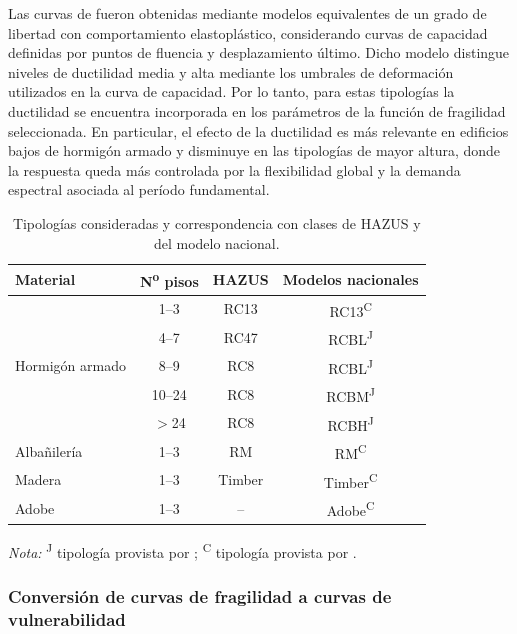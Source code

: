 Las curvas de  fueron obtenidas mediante modelos equivalentes de un grado de libertad con comportamiento elastoplástico, considerando curvas de capacidad definidas por puntos de fluencia y desplazamiento último. Dicho modelo distingue niveles de ductilidad media y alta mediante los umbrales de deformación utilizados en la curva de capacidad. Por lo tanto, para estas tipologías la ductilidad se encuentra incorporada en los parámetros de la función de fragilidad seleccionada. En particular, el efecto de la ductilidad es más relevante en edificios bajos de hormigón armado y disminuye en las tipologías de mayor altura, donde la respuesta queda más controlada por la flexibilidad global y la demanda espectral asociada al período fundamental.

\begin{table}[H]
\centering
\caption{Tipologías consideradas y correspondencia con clases de HAZUS y del modelo nacional.}
\label{tab:meto_tipologias_modelos}
\small
\setlength{\tabcolsep}{5pt}
\renewcommand{\arraystretch}{1.10}
\begin{tabular}{@{} l c c c @{}}
\toprule
\textbf{Material} & \textbf{N\textsuperscript{o} pisos} & \textbf{HAZUS} & \textbf{Modelos nacionales} \\
\midrule
\multirow{5}{*}{Hormigón armado}
 & 1--3   & RC13 & RC13\textsuperscript{C} \\
 & 4--7   & RC47 & RCBL\textsuperscript{J} \\
 & 8--9   & RC8  & RCBL\textsuperscript{J} \\
 & 10--24 & RC8  & RCBM\textsuperscript{J} \\
 & $>$24  & RC8  & RCBH\textsuperscript{J} \\
\addlinespace
Albañilería & 1--3 & RM     & RM\textsuperscript{C} \\
Madera      & 1--3 & Timber & Timber\textsuperscript{C} \\
Adobe       & 1--3 & --     & Adobe\textsuperscript{C} \\
\bottomrule
\end{tabular}

\vspace{2mm}
\footnotesize
\emph{Nota:} \textsuperscript{J} tipología provista por ;
\textsuperscript{C} tipología provista por .
\end{table}

\subsubsection{Conversión de curvas de fragilidad a curvas de vulnerabilidad}
\label{sec:meto_vuln_conv}


